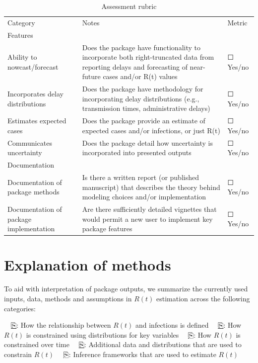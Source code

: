 \documentclass[
  letterpaper,
  DIV=11,
  numbers=noendperiod]{scrreprt}
\begin{document}
\begin{longtable}[]{@{}lll@{}}
\caption{Assessment rubric}\tabularnewline
\toprule\noalign{}
\endfirsthead
\endhead
\bottomrule\noalign{}
\endlastfoot
Category & Notes & Metric \\
Features & & \\
Ability to nowcast/forecast & Does the package have functionality to
incorporate both right-truncated data from reporting delays and
forecasting of near-future cases and/or R(t) values & ☐ Yes/no \\
Incorporates delay distributions & Does the package have methodology for
incorporating delay distributions (e.g., transmission times,
administrative delays) & ☐ Yes/no \\
Estimates expected cases & Does the package provide an estimate of
expected cases and/or infections, or just R(t) & ☐ Yes/no \\
Communicates uncertainty & Does the package detail how uncertainty is
incorporated into presented outputs & ☐ Yes/no \\
Documentation & & \\
Documentation of package methods & Is there a written report (or
published manuscript) that describes the theory behind modeling choices
and/or implementation & ☐ Yes/no \\
Documentation of package implementation & Are there sufficiently
detailed vignettes that would permit a new user to implement key package
features & ☐ Yes/no \\
\end{longtable}

\part{Explanation of methods}

To aid with interpretation of package outputs, we summarize the
currently used inputs, data, methods and assumptions in \(R(t)\)
estimation across the following categories:

 \href{methods_introduction.qmd}{⎘}: How the relationship between
\(R(t)\) and infections is defined  \href{methods_distributions.qmd}{⎘}:
How \(R(t)\) is constrained using distributions for key variables
 \href{methods_time.qmd}{⎘}: How \(R(t)\) is constrained over time
 \href{methods_additionaldata.qmd}{⎘}: Additional data and distributions
that are used to constrain \(R(t)\)  \href{methods_inference.qmd}{⎘}:
Inference frameworks that are used to estimate \(R(t)\)
\end{document}
